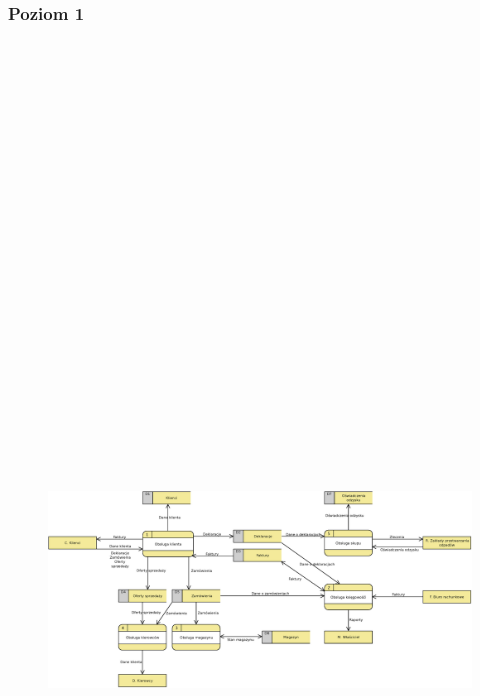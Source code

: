 \subsubsection{Poziom 1}
	\begin{figure}
		\centering
		\vspace{-2cm}
		\centerline{\includegraphics[angle=90, height=29cm]{img/DFD/1-level.eps}}
	\end{figure}

